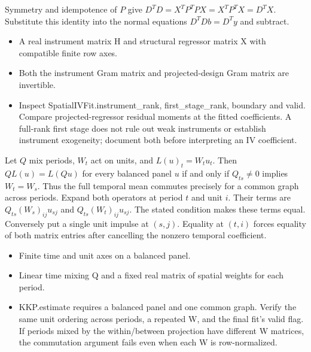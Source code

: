 \expandafter\def\csname statadic@proof@STATADIC-IV-001\endcsname{Symmetry and idempotence of $P$ give
  $D^TD=X^TP^TPX=X^TP^T X=D^TX$. Substitute this identity
  into the normal equations $D^TD b=D^Ty$ and subtract.}
\expandafter\def\csname statadic@assumptions@STATADIC-IV-001\endcsname{\begin{itemize}
\item A real instrument matrix H and structural regressor matrix X with compatible finite row axes.
\item Both the instrument Gram matrix and projected-design Gram matrix are invertible.
\end{itemize}}
\expandafter\def\csname statadic@diagnostics@STATADIC-IV-001\endcsname{\begin{itemize}
\item Inspect SpatialIVFit.instrument\_rank, first\_stage\_rank, boundary and valid. Compare projected-regressor residual moments at the fitted coefficients. A full-rank first stage does not rule out weak instruments or establish instrument exogeneity; document both before interpreting an IV coefficient.
\end{itemize}}
\expandafter\def\csname statadic@statement@STATADIC-KKP-001\endcsname{Let $Q$ mix periods, $W_t$ act on units, and $L(u)_t=W_t u_t$.
  Then $Q L(u)=L(Qu)$ for every balanced panel $u$ if and only if
  $Q_{ts}\ne0$ implies $W_t=W_s$. Thus the full temporal mean commutes
  precisely for a common graph across periods.}
\expandafter\def\csname statadic@proof@STATADIC-KKP-001\endcsname{Expand both operators at period $t$ and unit $i$. Their terms
  are $Q_{ts}(W_s)_{ij}u_{sj}$ and $Q_{ts}(W_t)_{ij}u_{sj}$.
  The stated condition makes these terms equal. Conversely put a single unit
  impulse at $(s,j)$. Equality at $(t,i)$ forces equality of both matrix
  entries after cancelling the nonzero temporal coefficient.}
\expandafter\def\csname statadic@assumptions@STATADIC-KKP-001\endcsname{\begin{itemize}
\item Finite time and unit axes on a balanced panel.
\item Linear time mixing Q and a fixed real matrix of spatial weights for each period.
\end{itemize}}
\expandafter\def\csname statadic@diagnostics@STATADIC-KKP-001\endcsname{\begin{itemize}
\item KKP.estimate requires a balanced panel and one common graph. Verify the same unit ordering across periods, a repeated W, and the final fit’s valid flag. If periods mixed by the within/between projection have different W matrices, the commutation argument fails even when each W is row-normalized.
\end{itemize}}
